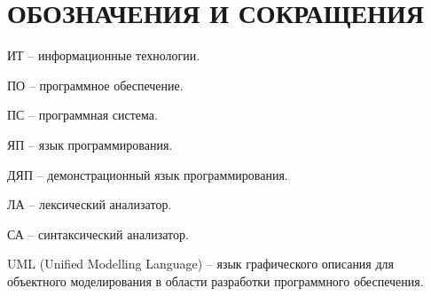 \section*{ОБОЗНАЧЕНИЯ И СОКРАЩЕНИЯ}

ИТ -- информационные технологии.

ПО -- программное обеспечение.

ПС -- программная система.

ЯП -- язык программирования.

ДЯП -- демонстрационный язык программирования.

ЛА -- лексический анализатор.

СА -- синтаксический анализатор.

UML (Unified Modelling Language) -- язык графического описания для объектного моделирования в области разработки программного обеспечения.